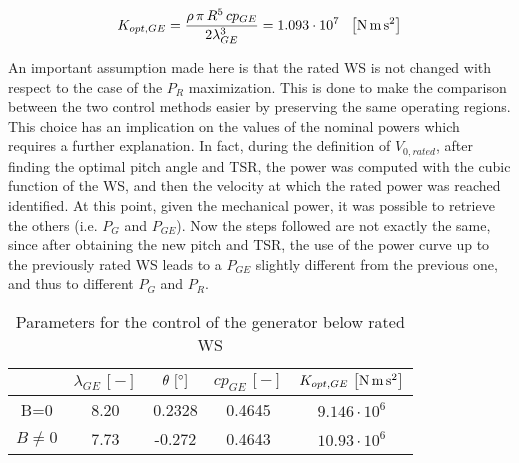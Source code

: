 \begin{equation}
  K_{opt,GE} = \frac{\rho \, \pi \, R^5 \, cp_{GE}}{2\lambda_{GE}^3} = 1.093\cdot10^7 \ \ \mesunt{\newton\meter\square\second}
  \label{eq:K_opt_GE}
\end{equation}

An important assumption made here is that the rated WS is not changed with respect to the case of the $P_R$ maximization. This is done to make the comparison between the two control methods easier by preserving the same operating regions. This choice has an implication on the values of the nominal powers which requires a further explanation. In fact, during the definition of $V_{0,rated}$, after finding the optimal pitch angle and TSR, the power was computed with the cubic function of the WS, and then the velocity at which the rated power was reached identified. At this point, given the mechanical power, it was possible to retrieve the others (i.e. $P_G$ and $P_{GE}$). Now the steps followed are not exactly the same, since after obtaining the new pitch and TSR, the use of the power curve up to the previously rated WS leads to a $P_{GE}$ slightly different from the previous one, and thus to different $P_G$ and $P_R$. %

\begin{table}[htb]
  \centering
  \caption{Parameters for the control of the generator below rated WS}
  \begin{tabular}{ccccc}
    \toprule
    & $\lambda_{GE} \, \left[-\right]$ & $\theta \, \left[\si{\degree}\right]$ & $cp_{GE} \, \left[-\right]$ & $K_{opt,GE} \, \left[\si{\newton\meter\square\second}\right]$ \\ \midrule
    B=0 & 8.20 & 0.2328 & 0.4645 & $9.146 \cdot 10^6$\\
    $B\ne0$ & 7.73 & -0.272 & 0.4643 & $10.93 \cdot 10^6$\\ \bottomrule
  \end{tabular}
  \label{tab:tab_k_opt_GE}
\end{table}

